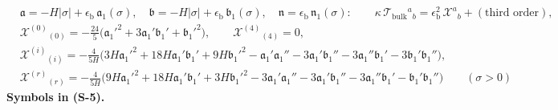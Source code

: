 \documentclass[
  10pt,
]{article}
\begin{document}
\[
\begin{aligned}
&\mathfrak{a} = -H\lvert\sigma\rvert + \epsilon_{\mathrm{b}}\,\mathfrak{a}_1(\sigma),\quad \mathfrak{b} = -H\lvert\sigma\rvert + \epsilon_{\mathrm{b}}\,\mathfrak{b}_1(\sigma),\quad
 \mathfrak{n} = \epsilon_{\mathrm{b}}\,\mathfrak{n}_1(\sigma):\qquad
 \kappa\,\mathcal{T}_{\mathrm{bulk}}{}^a{}_b = \epsilon_{\mathrm{b}}^2\,\mathcal{X}^a{}_b + (\text{third order}),\\
&\mathcal{X}^{(0)}{}_{(0)} = -\frac{24}{5}\big(\mathfrak{a}_1'^2 + 3\mathfrak{a}_1'\mathfrak{b}_1' + \mathfrak{b}_1'^2\big),\qquad \mathcal{X}^{(4)}{}_{(4)} = 0,\\
&\mathcal{X}^{(i)}{}_{(i)} = -\frac{4}{5H}\big(3H\mathfrak{a}_1'^2 + 18H\mathfrak{a}_1'\mathfrak{b}_1' + 9H\mathfrak{b}_1'^2 - \mathfrak{a}_1'\mathfrak{a}_1''
 - 3\mathfrak{a}_1'\mathfrak{b}_1'' - 3\mathfrak{a}_1''\mathfrak{b}_1' - 3\mathfrak{b}_1'\mathfrak{b}_1''\big),\\
&\mathcal{X}^{(r)}{}_{(r)} = -\frac{4}{5H}\big(9H\mathfrak{a}_1'^2 + 18H\mathfrak{a}_1'\mathfrak{b}_1' + 3H\mathfrak{b}_1'^2 - 3\mathfrak{a}_1'\mathfrak{a}_1''
 - 3\mathfrak{a}_1'\mathfrak{b}_1'' - 3\mathfrak{a}_1''\mathfrak{b}_1' - \mathfrak{b}_1'\mathfrak{b}_1''\big)\qquad(\sigma > 0)
\end{aligned} \tag{S-5}
\] \textbf{Symbols in (S-5).}
\end{document}
